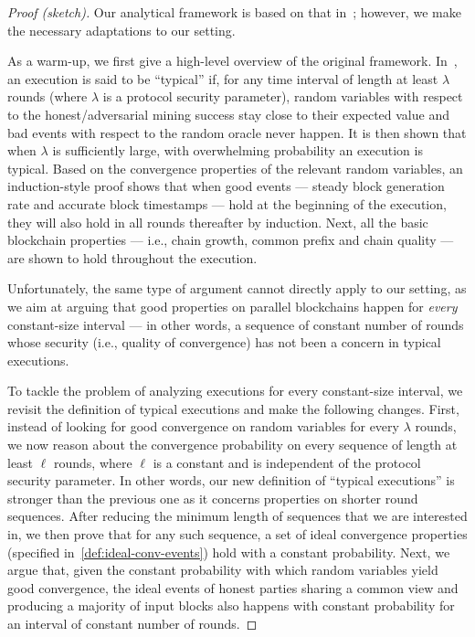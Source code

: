 \begin{proof}[Proof (sketch)]
    Our analytical framework is based on that in~\cite{C:GarKiaLeo17,EPRINT:GarKiaLeo20}; however, we make the necessary adaptations to our setting.

    As a warm-up, we first give a high-level overview of the original framework.
    In~\cite{C:GarKiaLeo17,EPRINT:GarKiaLeo20}, an execution is said to be ``typical'' if, for any time interval of length at least $\lambda$ rounds (where $\lambda$ is a protocol security parameter), random variables with respect to the honest/adversarial mining success stay close to their expected value and bad events with respect to the random oracle never happen.
    It is then shown that when $\lambda$ is sufficiently large, with overwhelming probability an execution is typical.
    Based on the convergence properties of the relevant random variables, an induction-style proof shows that when good events --- steady block generation rate and accurate block timestamps --- hold at the beginning of the execution, they will also hold in all rounds thereafter by induction.
    Next, all the basic blockchain properties --- i.e., chain growth, common prefix and chain quality --- are shown to hold throughout the execution.

    Unfortunately, the same type of argument cannot directly apply to our setting, as we aim at arguing that good properties on parallel blockchains happen for \emph{every} constant-size interval --- in other words, a sequence of constant number of rounds whose security (i.e., quality of convergence) has not been a concern in typical executions.

    To tackle the problem of analyzing executions for every constant-size interval, we revisit the definition of typical executions and make the following changes.
    First, instead of looking for good convergence on random variables for every $\lambda$ rounds, we now reason about the convergence probability on every sequence of length at least $\ell$ rounds, where $\ell$ is a constant and is independent of the protocol security parameter.
    In other words, our new definition of ``typical executions'' is stronger than the previous one as it concerns properties on shorter round sequences.
    After reducing the minimum length of sequences that we are interested in, we then prove that for any such sequence, a set of ideal convergence properties (specified in~\cref{def:ideal-conv-events}) hold with a constant probability.
    Next, we argue that, given the constant probability with which random variables yield good convergence, the ideal events of honest parties sharing a common view and producing a majority of input blocks also happens with constant probability for an interval of constant number of rounds.


\end{proof}
